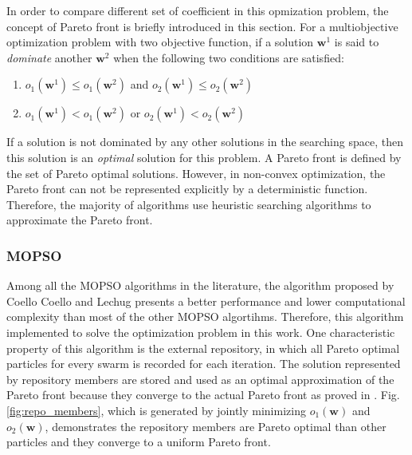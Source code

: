 In order to compare different set of coefficient in this opmization problem, the concept of Pareto front is briefly introduced in this section. For a multiobjective optimization problem with two objective function, if a solution $\mathbf{w}^1$ is said to \textit{dominate} another $\mathbf{w}^2$ when the following two conditions are satisfied:
\begin{enumerate}
    \item $o_1(\mathbf{w}^1) \leq  o_1(\mathbf{w}^2)$ and $o_2(\mathbf{w}^1) \leq  o_2(\mathbf{w}^2)$ 
    \item $o_1(\mathbf{w}^1) <  o_1(\mathbf{w}^2)$ or $o_2(\mathbf{w}^1) < o_2(\mathbf{w}^2)$ 
\end{enumerate}

If a solution is not dominated by any other solutions in the searching space, then this solution is an \textit{optimal} solution for this problem. A Pareto front is defined by the set of Pareto optimal solutions. However, in non-convex optimization, the Pareto front can not be represented explicitly by a deterministic function. Therefore, the majority of algorithms use heuristic searching algorithms to approximate the Pareto front\cite{coello2002mopso}.

\subsubsection{MOPSO}

Among all the MOPSO algorithms in the literature, the algorithm proposed by Coello Coello and Lechug presents a better performance and lower computational complexity than most of the other MOPSO algortihms\cite{coello2002mopso}. Therefore, this algorithm implemented to solve the optimization problem in this work. One characteristic property of this algorithm is the external repository, in which all Pareto optimal particles for every swarm is recorded for each iteration. The solution represented by repository members are stored and used as an optimal approximation of the Pareto front because they converge to the actual Pareto front as proved in \cite{coello2002mopso}. Fig.\ref{fig:repo_members}, which is generated by jointly minimizing $o_1(\mathbf{w}) $ and $o_2(\mathbf{w})$, demonstrates the repository members are Pareto optimal than other particles and they converge to a uniform Pareto front.

